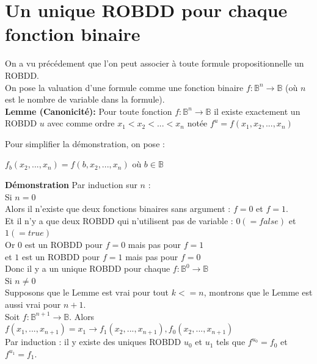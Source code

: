 \documentclass[a4paper, oneside]{report}
\begin{document}
\section{Un unique ROBDD pour chaque fonction binaire}

On a vu précédement que l'on peut associer à toute formule propositionnelle un ROBDD.\\

On pose la valuation d'une formule comme une fonction binaire $f :\mathbb{B}^n \to \mathbb{B}$ (où $n$ est le nombre de variable dans la formule).\\

\textbf{Lemme (Canonicité): } Pour toute fonction $f :\mathbb{B}^n \to \mathbb{B}$ il existe exactement un ROBDD $u$ avec comme ordre $x_1 < x_2 < ... < x_n$ notée $f^u = f(x_1,x_2,...,x_n)$

Pour simplifier la démonstration, on pose :\\
\begin{center}
$f_b(x_2,...,x_n) = f(b,x_2,...,x_n)$ où $b \in \mathbb{B}$\\
\end{center}

\textbf{Démonstration } Par induction sur $n$ :\\

Si $n = 0$\\
Alors il n'existe que deux fonctions binaires sans argument : $f = 0$ et $f = 1$.\\
Et il n'y a que deux ROBDD qui n'utilisent pas de variable : $0 (= false)$ et $1 (= true)$\\
Or $0$ est un ROBDD pour $f = 0$ mais pas pour $f = 1$ \\
et $1$ est un ROBDD pour $f = 1$ mais pas pour $f = 0$ \\
Donc il y a un unique ROBDD pour chaque $f :\mathbb{B}^0 \to \mathbb{B}$ \\

Si $n \neq 0$\\
Supposons que le Lemme est vrai pour tout $k <= n$, montrons que le Lemme est aussi vrai pour $n+1$.\\

Soit $f :\mathbb{B}^{n+1} \to \mathbb{B}$.
Alors $f(x_1,...,x_{n+1}) = x_1 \rightarrow f_1(x_2,...,x_{n+1}), f_0(x_2,...,x_{n+1})$\\
Par induction : il y existe des uniques ROBDD $u_0$ et $u_1$ tels que $f^{u_0} = f_0$ et $f^{u_1} = f_1$.\\
\end{document}
